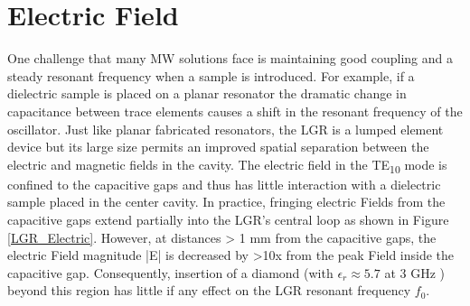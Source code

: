 \section{Electric Field}

One challenge that many MW solutions face is maintaining good coupling and a steady resonant frequency when a sample is introduced. For example, if a dielectric sample is placed on a planar resonator the dramatic change in capacitance between trace elements causes a shift in the resonant frequency \cite{bayat2014efficient, sasaki2016broadband, zhang2016microwave} of the oscillator. Just like planar fabricated resonators, the LGR is a lumped element device but its large size permits an improved spatial separation between the electric and magnetic fields in the cavity. The electric field in the TE\textsubscript{10} mode is confined to the capacitive gaps and thus has little interaction with a dielectric sample placed in the center cavity. In practice, fringing electric Fields from the capacitive gaps extend partially into the LGR's central loop as shown in Figure \ref{LGR_Electric}. However, at distances > 1 mm from the capacitive gaps, the electric Field magnitude |E| is decreased by >10x from the peak Field inside the capacitive gap. Consequently, insertion of a diamond (with
$\epsilon_r \approx 5.7$ at 3 GHz \cite{ibarra1997wide}) beyond this region has little if any effect on the LGR resonant frequency $f_0$.


